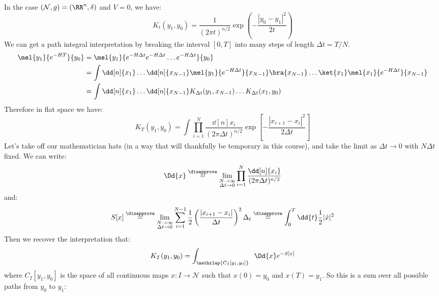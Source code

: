 \documentclass{jknotes}
\begin{document}
In the case \((\mathcal{N},g) = (\RR^n,\delta)\) and \(V=0\), we have:
\begin{equation}
K_t(y_1,y_0) = \frac{1}{(2\pi t)^{n/2}}\exp\left( -\frac{|y_0-y_1|^2}{2t} \right)
\end{equation}
We can get a path integral interpretation by breaking the interval \([0,T]\) into many steps of length \(\Delta t = T/N\).
\begin{align}
    \mel{y_1}{e^{-HT}}{y_0}
    &= \mel{y_1}{e^{-H\Delta t}e^{-H\Delta t}\dots e^{-H\Delta t}}{y_0} \\
    &= \int \dd[n]{x_1}\dots\dd[n]{x_{N-1}} \mel{y_1}{e^{-H\Delta t}}{x_{N-1}} \bra{x_{N-1}} \dots \ket{x_1} \mel{x_1}{e^{-H\Delta t}}{x_{N-1}} \\
    &= \int \dd[n]{x_1}\dots\dd[n]{x_{N-1}} K_{\Delta t}(y_1,x_{N-1}) \dots K_{\Delta t}(x_1,y_0)
\end{align}
Therefore in flat space we have:
\begin{equation}
    K_T(y_1,y_0) = \int \prod_{i=1}^N \frac{\dd[n]{x_i}}{(2\pi\Delta t)^{n/2}}\exp\left[ -\frac{|x_{i+1}-x_i|^2}{2\Delta t} \right]
\end{equation}
Let's take off our mathematician hats (in a way that will thankfully be temporary in this course), and take the limit as \(\Delta t\to 0\) with \(N\Delta t\) fixed. We can write:
\begin{equation}
    \Dd{x} \stackrel{\disapprove}{=} \lim_{\substack{N\to\infty\\\Delta t\to0}} \prod_{i=1}^N \frac{\dd[n]{x_i}}{(2\pi\Delta t)^{n/2}}
\end{equation}
and:
\begin{equation}
    S[x] \stackrel{\disapprove}{=} \lim_{\substack{N\to\infty\\\Delta t\to0}} \sum_{i=1}^{N-1}\frac{1}{2}\left( \frac{|x_{i+1}-x_i|}{\Delta t} \right)^2\Delta_t \stackrel{\disapprove}{=}
    \int^T_0 \dd{t}\frac{1}{2}|\dot{x}|^2
\end{equation}
Then we recover the interpretation that:
\begin{equation}
    K_T(y_1,y_0) = \int_{\mathrlap{C_I[y_1,y_0]}} \;\; \Dd{x} e^{-S[x]}
\end{equation}
where \(C_I[y_1,y_0]\) is the space of all continuous maps \(x:I\to\mathcal{N}\) such that \(x(0) = y_0\) and \(x(T) = y_1\). So this is a sum over all possible paths from \(y_0\) to \(y_1\):
\begin{figure}[H]
    \centering
\end{figure}
\end{document}
